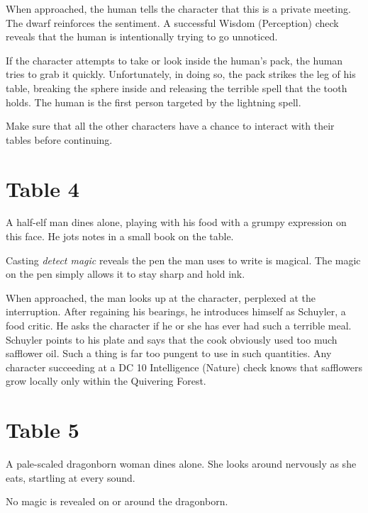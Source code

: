 \documentclass[10pt,a4paper,twoside,bg=print,twocolumn,openany,nodeprecatedcode]{dndbook}
\begin{document}
When approached, the human tells the character that this is a private meeting. The dwarf reinforces the sentiment. A successful Wisdom (Perception) check reveals that the human is intentionally trying to go unnoticed.

If the character attempts to take or look inside the human's pack, the human tries to grab it quickly. Unfortunately, in doing so, the pack strikes the leg of his table, breaking the sphere inside and releasing the terrible spell that the tooth holds. The human is the first person targeted by the lightning spell.

Make sure that all the other characters have a chance to interact with their tables before continuing.

\section{Table 4}
\begin{DndReadAloud}{}
A half-elf man dines alone, playing with his food with a grumpy expression on this face. He jots notes in a small book on the table.

\end{DndReadAloud}

Casting \textit{detect magic} reveals the pen the man uses to write is magical. The magic on the pen simply allows it to stay sharp and hold ink.

When approached, the man looks up at the character, perplexed at the interruption. After regaining his bearings, he introduces himself as Schuyler, a food critic. He asks the character if he or she has ever had such a terrible meal. Schuyler points to his plate and says that the cook obviously used too much safflower oil. Such a thing is far too pungent to use in such quantities. Any character succeeding at a DC 10 Intelligence (Nature) check knows that safflowers grow locally only within the Quivering Forest.

\section{Table 5}
\begin{DndReadAloud}{}
A pale-scaled dragonborn woman dines alone. She looks around nervously as she eats, startling at every sound.

\end{DndReadAloud}

No magic is revealed on or around the dragonborn.
\end{document}
